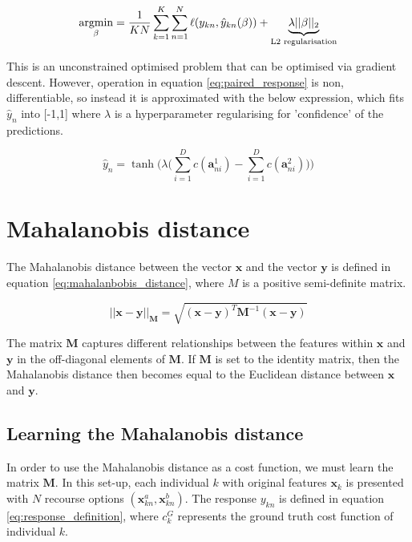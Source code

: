 \begin{equation}
	\operatorname*{argmin}_\beta = \frac{1}{KN} \sum_{k=1}^K \sum_{n=1}^N \ell (y_{kn}, \hat{y}_{kn}(\beta)) + \underbrace{\lambda ||\beta||_2}_{\text{L2 regularisation}}
\end{equation}

This is an unconstrained optimised problem that can be optimised via gradient descent. However, operation in equation \ref{eq:paired_response} is non, differentiable, so instead it is approximated with the below expression, which fits $\hat{y}_n$ into [-1,1] where $\lambda$ is a hyperparameter regularising for 'confidence' of the predictions.

\begin{equation}
	\hat{y}_n = \tanh \Bigg(\lambda \Big(\sum_{i=1}^D c(\mathbf{a}^1_{ni}) - \sum_{i=1}^D c(\mathbf{a}^2_{ni})\Big)\Bigg)
\end{equation}


\section{Mahalanobis distance}

The Mahalanobis distance between the vector $\mathbf{x}$ and the vector $\mathbf{y}$ is defined in equation \ref{eq:mahalanbobis_distance}, where $M$ is a positive semi-definite matrix.

\begin{equation} \label{eq:mahalanbobis_distance}
	||\mathbf{x-y}||_{\mathbf{M}} = \sqrt{(\mathbf{x-y})^T\mathbf{M}^{-1}(\mathbf{x-y})}
\end{equation}

The matrix $\mathbf{M}$ captures different relationships between the features within $\mathbf{x}$ and $\mathbf{y}$ in the off-diagonal elements of $\mathbf{M}$. If $\mathbf{M}$ is set to the identity matrix, then the Mahalanobis distance then becomes equal to the Euclidean distance between $\mathbf{x}$ and $\mathbf{y}$. \\

\subsection{Learning the Mahalanobis distance}

In order to use the Mahalanobis distance as a cost function, we must learn the matrix $\mathbf{M}$. In this set-up, each individual $k$ with original features $\mathbf{x}_k$ is presented with $N$ recourse options $(\mathbf{x}_{kn}^a, \mathbf{x}_{kn}^b)$. The response $y_{kn}$ is defined in equation \ref{eq:response_definition}, where $c^G_k$ represents the ground truth cost function of individual $k$.

